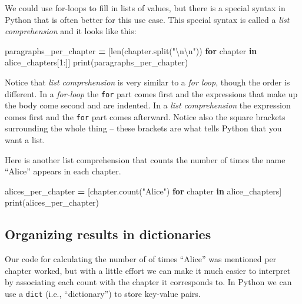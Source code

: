 \documentclass[]{book}
\newenvironment{Shaded}{\begin{snugshade}}{\end{snugshade}}
\newcommand{\KeywordTok}[1]{\textcolor[rgb]{0.13,0.29,0.53}{\textbf{#1}}}
\newcommand{\DecValTok}[1]{\textcolor[rgb]{0.00,0.00,0.81}{#1}}
\newcommand{\CharTok}[1]{\textcolor[rgb]{0.31,0.60,0.02}{#1}}
\newcommand{\StringTok}[1]{\textcolor[rgb]{0.31,0.60,0.02}{#1}}
\newcommand{\ControlFlowTok}[1]{\textcolor[rgb]{0.13,0.29,0.53}{\textbf{#1}}}
\newcommand{\OperatorTok}[1]{\textcolor[rgb]{0.81,0.36,0.00}{\textbf{#1}}}
\newcommand{\BuiltInTok}[1]{#1}
\newcommand{\NormalTok}[1]{#1}
\begin{document}
We could use for-loops to fill in lists of values, but there is a
special syntax in Python that is often better for this use case. This
special syntax is called a \emph{list comprehension} and it looks like
this:

\begin{Shaded}
\begin{Highlighting}[]
\NormalTok{paragraphs_per_chapter }\OperatorTok{=}\NormalTok{ [}\BuiltInTok{len}\NormalTok{(chapter.split(}\StringTok{"}\CharTok{\textbackslash{}n\textbackslash{}n}\StringTok{"}\NormalTok{)) }
                          \ControlFlowTok{for}\NormalTok{ chapter }\KeywordTok{in}\NormalTok{ alice_chapters[}\DecValTok{1}\NormalTok{:]]}
\BuiltInTok{print}\NormalTok{(paragraphs_per_chapter)}
\end{Highlighting}
\end{Shaded}

Notice that \emph{list comprehension} is very similar to a \emph{for
loop}, though the order is different. In a \emph{for-loop} the
\texttt{for} part comes first and the expressions that make up the body
come second and are indented. In a \emph{list comprehension} the
expression comes first and the \texttt{for} part comes afterward. Notice
also the square brackets surrounding the whole thing -- these brackets
are what tells Python that you want a list.

Here is another list comprehension that counts the number of times the
name ``Alice'' appears in each chapter.

\begin{Shaded}
\begin{Highlighting}[]
\NormalTok{alices_per_chapter }\OperatorTok{=}\NormalTok{ [chapter.count(}\StringTok{"Alice"}\NormalTok{) }\ControlFlowTok{for}\NormalTok{ chapter }\KeywordTok{in}\NormalTok{ alice_chapters]}
\BuiltInTok{print}\NormalTok{(alices_per_chapter)}
\end{Highlighting}
\end{Shaded}

\subsection{Organizing results in
dictionaries}\label{organizing-results-in-dictionaries}

Our code for calculating the number of of times ``Alice'' was mentioned
per chapter worked, but with a little effort we can make it much easier
to interpret by associating each count with the chapter it corresponds
to. In Python we can use a \texttt{dict} (i.e., ``dictionary'') to store
key-value pairs.
\end{document}
